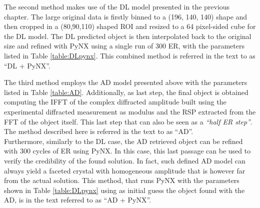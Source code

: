 The second method makes use of the DL model presented in the previous chapter. The large original data is firstly 
binned to a (196, 140, 140) shape and then cropped in a (80,90,110) shaped ROI and resized to a 64 pixel-sided cube 
for the DL model. The DL predicted object is then 
interpolated back to the original size and refined with PyNX using a single run of 300 ER, with the parameters 
listed in Table \ref{table:DLpynx}. This combined method is referred in the text to as ``DL + PyNX''. 
 
The third method employs the AD model presented above with the parameters listed in Table \ref{table:AD}. 
Additionally, as last step, the final object is obtained computing the IFFT of the complex diffracted amplitude built 
using the experimental diffracted measurement as modulus and the RSP extracted from the FFT of the object itself.
This last step that can also be seen as a \textit{``half ER step''}. The method described here is referred in the text 
to as ``AD''. \\

Furthermore, similarly to the DL case, the AD retrieved object can be refined with 300 cycles of ER using PyNX. In this case, 
this last passage can be used to verify the credibility of the found solution. In fact, such defined AD model can always yield 
a faceted crystal with homogeneous amplitude that is however far from the actual solution. This method, that runs PyNX with the 
parameters shown in Table \ref{table:DLpynx} using as initial guess the object found with the AD, is in the text referred to as 
``AD + PyNX''. 

